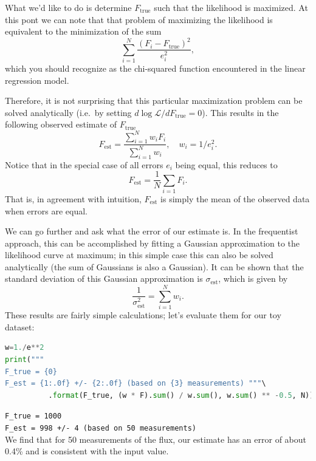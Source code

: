 \documentclass[%
oneside,                 %
final,                   %
10pt]{article}
\begin{document}
What we'd like to do is determine $F_\mathrm{true}$ such that the likelihood is maximized. At this pont we can note that that problem of maximizing the likelihood is equivalent to the minimization of the sum
\begin{equation}
\sum_{i=1}^N \frac{(F_i-F_\mathrm{true})^2}{e_i^2},
\end{equation}
which you should recognize as the chi-squared function encountered in the linear regression model.

Therefore, it is not surprising that this particular maximization problem can be solved analytically (i.e.~by setting $d\log\mathcal{L}/d F_\mathrm{true} = 0$). This results in the following observed estimate of $F_\mathrm{true}$
\begin{equation}
F_\mathrm{est} = \frac{ \sum_{i=1}^N w_i F_i }{ \sum_{i=1}^N w_i}, \quad w_i = 1/e_i^2.
\end{equation}
Notice that in the special case of all errors $e_i$ being equal, this reduces to
\begin{equation}
F_\mathrm{est} = \frac{1}{N} \sum_{i=1} F_i.
\end{equation}
That is, in agreement with intuition, $F_\mathrm{est}$ is simply the mean of the observed data when errors are equal.

We can go further and ask what the error of our estimate is. In the frequentist approach, this can be accomplished by fitting a Gaussian approximation to the likelihood curve at maximum; in this simple case this can also be solved analytically (the sum of Gaussians is also a Gaussian). It can be shown that the standard deviation of this Gaussian approximation is $\sigma_\mathrm{est}$, which is given by
\begin{equation}
\frac{ 1 } {\sigma_\mathrm{est}^2} = \sum_{i=1}^N w_i .
\end{equation}
These results are fairly simple calculations; let's evaluate them for our toy dataset:

\begin{lstlisting}[language=Python,style=blue1]
w=1./e**2
print("""
F_true = {0}
F_est = {1:.0f} +/- {2:.0f} (based on {3} measurements) """\ 
          .format(F_true, (w * F).sum() / w.sum(), w.sum() ** -0.5, N))
\end{lstlisting}
\Verb!F_true = 1000! \\
\Verb!F_est = 998 +/- 4 (based on 50 measurements)! \\

We find that for 50 measurements of the flux, our estimate has an error of about 0.4\% and is consistent with the input value.
\end{document}
